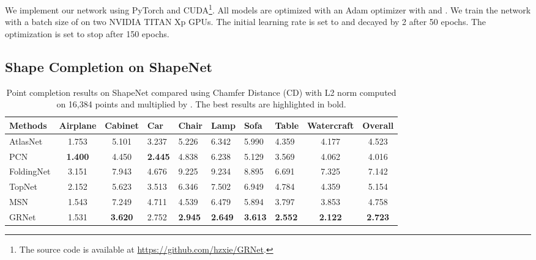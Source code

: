 \documentclass[runningheads]{llncs}
\begin{document}
We implement our network using PyTorch \cite{DBLP:conf/nips/AdamSSGEZZALA19} and CUDA\footnote{The source code is available at \url{https://github.com/hzxie/GRNet}.}.
All models are optimized with an Adam optimizer \cite{DBLP:conf/iclr/KingmaB14} with  and .
We train the network with a batch size of  on two NVIDIA TITAN Xp GPUs.
The initial learning rate is set to  and decayed by 2 after 50 epochs.
The optimization is set to stop after 150 epochs.

\subsection{Shape Completion on ShapeNet}

\begin{table*}[!t]
  \caption{Point completion results on ShapeNet compared using Chamfer Distance (CD) with L2 norm computed on 16,384 points and multiplied by . The best results are highlighted in bold.}
  \begin{tabularx}{\linewidth}{l|ccYYYYYc|c}
    \toprule
    Methods      & Airplane   & Cabinet    & Car        & Chair 
                 & Lamp       & Sofa       & Table      & Watercraft 
                 & Overall \\
    \midrule  
    AtlasNet \cite{DBLP:conf/cvpr/GroueixFKRA18}    
                 & 1.753      & 5.101      & 3.237      & 5.226
                 & 6.342      & 5.990      & 4.359      & 4.177
                 & 4.523 \\ 
    PCN \cite{DBLP:conf/ThreeDim/YuanKHMH18}
                 & \bf{1.400} & 4.450      & \bf{2.445} & 4.838
                 & 6.238      & 5.129      & 3.569      & 4.062
                 & 4.016 \\
    FoldingNet \cite{DBLP:conf/cvpr/YangFST18}
                 & 3.151      & 7.943      & 4.676      & 9.225
                 & 9.234      & 8.895      & 6.691      & 7.325
                 & 7.142 \\
    TopNet \cite{DBLP:conf/cvpr/TchapmiKR0S19}
                 & 2.152      & 5.623      & 3.513      & 6.346
                 & 7.502      & 6.949      & 4.784      & 4.359
                 & 5.154 \\
    MSN \cite{DBLP:conf/aaai/LiuSYSH20}
                 & 1.543      & 7.249      & 4.711      & 4.539
                 & 6.479      & 5.894      & 3.797      & 3.853
                 & 4.758 \\
    GRNet        & 1.531      & \bf{3.620} & 2.752      & \bf{2.945}
                 & \bf{2.649} & \bf{3.613} & \bf{2.552} & \bf{2.122}
                 & \bf{2.723} \\
  	\bottomrule
  \end{tabularx}
  \label{tab:shapenet-reconstruction-cd}
\end{table*}
\end{document}
